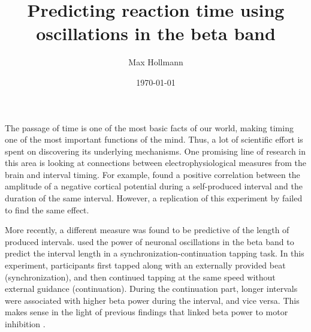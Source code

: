\documentclass[man]{apa6} %
\title{Predicting reaction time using oscillations in the beta band}
\author{Max Hollmann}
\affiliation{University of Groningen}
\date{\today}
\begin{document}
\maketitle

%


The passage of time is one of the most basic facts of our world, making timing one of the most important functions of the mind.
Thus, a lot of scientific effort is spent on discovering its underlying mechanisms.
One promising line of research in this area is looking at connections between electrophysiological measures from the brain and interval timing.
For example,  found a positive correlation between the amplitude of a negative cortical potential during a self-produced interval and the duration of the same interval.
However, a replication of this experiment by  failed to find the same effect.

More recently, a different measure was found to be predictive of the length of produced intervals.
 used the power of neuronal oscillations in the beta band to predict the interval length in a synchronization-continuation tapping task.
In this experiment, participants first tapped along with an externally provided beat (synchronization), and then continued tapping at the same speed without external guidance (continuation).
During the continuation part, longer intervals were associated with higher beta power during the interval, and vice versa.
This makes sense in the light of previous findings that linked beta power to motor inhibition \cite{joundi_driving_2012}.
\end{document}
